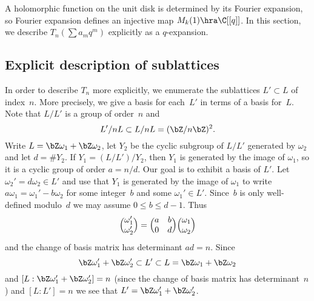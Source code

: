\documentclass{report}
\begin{document}
A holomorphic function on the unit disk is determined by its Fourier
expansion, so Fourier expansion defines an injective map $M_k(1)\hra
\C[[q]]$.  In this section, we describe $T_n(\sum a_m q^m)$ explicitly
as a $q$-expansion.

\subsection{Explicit description of sublattices}\label{sec:explattice} In order to describe $T_n$ more
explicitly, we enumerate the sublattices $L'\subset L$
of index~$n$.  More precisely, we give a basis for each~$L'$ in
terms of a basis for~$L$.  Note that $L/L'$ is a group of
order~$n$ and
\[
L'/nL \subset L/nL=(\bZ/n\bZ)^2.
\]
Write $L=\bZ\omega_1+\bZ\omega_2$, let $Y_2$ be the cyclic
subgroup of $L/L'$ generated by $\omega_2$ and let $d=\#Y_2$. If
$Y_1=(L/L')/Y_2$, then $Y_1$ is generated by the image of
$\omega_1$, so it is a cyclic group of order $a=n/d$.  Our goal is
to exhibit a basis of $L'$. Let $\omega_2'=d\omega_2\in L'$ and
use that $Y_1$ is generated by the image of $\omega_1$ to write
$a\omega_1=\omega_1'-b\omega_2$ for some integer~$b$ and some
$\omega_1'\in L'$. Since~$b$ is only well-defined modulo~$d$ we
may assume $0\leq b\leq d-1$. Thus
$$
\Bigl(\begin{matrix}\omega_1'\\ \omega_2'\end{matrix}\Bigr)
=
\Bigl(\begin{matrix}a&b\\0&d\end{matrix}\Bigr)
\Bigl(\begin{matrix}\omega_1\\ \omega_2\end{matrix}\Bigr)
$$
and the change of basis matrix has determinant $ad=n$. Since
\[
 \bZ\omega_1'+\bZ\omega_2'\subset L' \subset
  L=\bZ\omega_1+\bZ\omega_2
\]
and $[L:\bZ\omega_1'+\bZ\omega_2']=n$ (since the change of basis
matrix has determinant~$n$) and $[L:L']=n$ we see that
$L'=\bZ\omega_1'+\bZ\omega_2'$.
\end{document}

